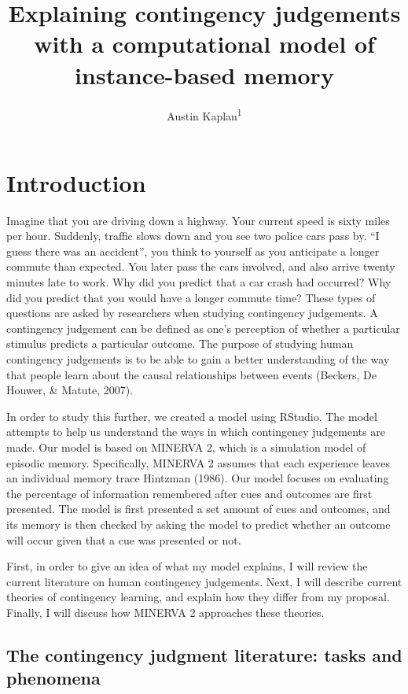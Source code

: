 \documentclass[
  english,
  man,floatsintext]{apa6}
\title{Explaining contingency judgements with a computational model of instance-based memory}
\author{Austin Kaplan\textsuperscript{1}}
\date{}
\affiliation{\vspace{0.5cm}\textsuperscript{1} Brooklyn College}
\begin{document}
\maketitle

\hypertarget{introduction}{%
\section{Introduction}\label{introduction}}

Imagine that you are driving down a highway. Your current speed is sixty miles per hour. Suddenly, traffic slows down and you see two police cars pass by. \enquote{I guess there was an accident}, you think to yourself as you anticipate a longer commute than expected. You later pass the cars involved, and also arrive twenty minutes late to work. Why did you predict that a car crash had occurred? Why did you predict that you would have a longer commute time? These types of questions are asked by researchers when studying contingency judgements. A contingency judgement can be defined as one's perception of whether a particular stimulus predicts a particular outcome. The purpose of studying human contingency judgements is to be able to gain a better understanding of the way that people learn about the causal relationships between events (Beckers, De Houwer, \& Matute, 2007).

In order to study this further, we created a model using RStudio. The model attempts to help us understand the ways in which contingency judgements are made. Our model is based on MINERVA 2, which is a simulation model of episodic memory. Specifically, MINERVA 2 assumes that each experience leaves an individual memory trace Hintzman (1986). Our model focuses on evaluating the percentage of information remembered after cues and outcomes are first presented. The model is first presented a set amount of cues and outcomes, and its memory is then checked by asking the model to predict whether an outcome will occur given that a cue was presented or not.

First, in order to give an idea of what my model explains, I will review the current literature on human contingency judgements. Next, I will describe current theories of contingency learning, and explain how they differ from my proposal. Finally, I will discuss how MINERVA 2 approaches these theories.

\hypertarget{the-contingency-judgment-literature-tasks-and-phenomena}{%
\subsection{The contingency judgment literature: tasks and phenomena}\label{the-contingency-judgment-literature-tasks-and-phenomena}}
\end{document}
